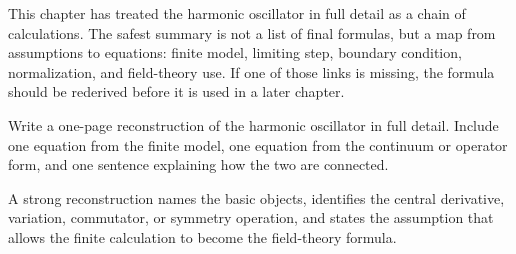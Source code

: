This chapter has treated the harmonic oscillator in full detail as a chain of calculations.  The safest summary is not a list of final formulas, but a map from assumptions to equations: finite model, limiting step, boundary condition, normalization, and field-theory use.  If one of those links is missing, the formula should be rederived before it is used in a later chapter.

\begin{exercise}
Write a one-page reconstruction of the harmonic oscillator in full detail.  Include one equation from the finite model, one equation from the continuum or operator form, and one sentence explaining how the two are connected.
\begin{answer}
A strong reconstruction names the basic objects, identifies the central derivative, variation, commutator, or symmetry operation, and states the assumption that allows the finite calculation to become the field-theory formula.
\end{answer}
\end{exercise}
